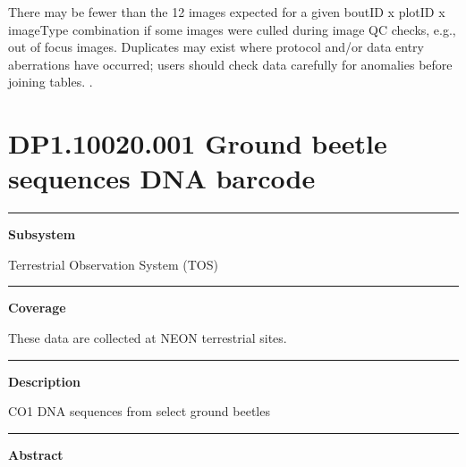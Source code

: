 \documentclass[]{article}
\begin{document}
There may be fewer than the 12 images expected for a given boutID x
plotID x imageType combination if some images were culled during image
QC checks, e.g., out of focus images. Duplicates may exist where
protocol and/or data entry aberrations have occurred; users should check
data carefully for anomalies before joining tables. \newpage
.

\section{DP1.10020.001 Ground beetle sequences DNA
barcode}\label{dp1.10020.001-ground-beetle-sequences-dna-barcode}

\begin{center}\rule{0.5\linewidth}{\linethickness}\end{center}

\textbf{Subsystem}

Terrestrial Observation System (TOS)

\begin{center}\rule{0.5\linewidth}{\linethickness}\end{center}

\textbf{Coverage}

These data are collected at NEON terrestrial sites.

\begin{center}\rule{0.5\linewidth}{\linethickness}\end{center}

\textbf{Description}

CO1 DNA sequences from select ground beetles

\begin{center}\rule{0.5\linewidth}{\linethickness}\end{center}

\textbf{Abstract}
\end{document}
